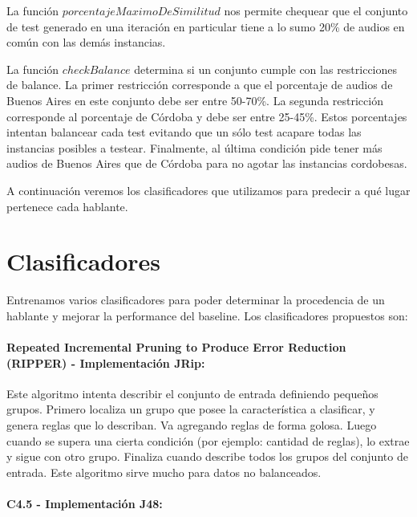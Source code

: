 La función $porcentajeMaximoDeSimilitud$ nos permite chequear que el conjunto de test generado en una iteración en particular tiene a lo sumo 20\% de audios en común con las demás instancias.

La función $checkBalance$ determina si un conjunto cumple con las restricciones de balance. La primer restricción corresponde a que el porcentaje de audios de Buenos Aires en este conjunto debe ser entre 50-70\%. La segunda restricción corresponde al porcentaje de Córdoba y debe ser entre 25-45\%. Estos porcentajes intentan balancear cada test evitando que un sólo test acapare todas las instancias posibles a testear. Finalmente, al última condición pide tener más audios de Buenos Aires que de Córdoba para no agotar las instancias cordobesas.

A continuación veremos los clasificadores que utilizamos para predecir a qué lugar pertenece cada hablante.

\section{Clasificadores}

Entrenamos varios clasificadores para poder determinar la procedencia de un hablante y mejorar la performance del baseline. Los clasificadores propuestos son: 

\paragraph{Repeated Incremental Pruning to Produce Error Reduction (RIPPER) \cite{Cohen1995} - Implementación JRip:}


Este algoritmo intenta describir el conjunto de entrada definiendo pequeños grupos. Primero localiza un grupo que posee la característica a clasificar, y genera reglas que lo describan. Va agregando reglas de forma golosa. Luego cuando se supera una cierta condición (por ejemplo: cantidad de reglas), lo extrae y sigue con otro grupo. Finaliza cuando describe todos los grupos del conjunto de entrada. Este algoritmo sirve mucho para datos no balanceados.

\paragraph{C4.5 \cite{Quinlan1993} - Implementación J48:}

